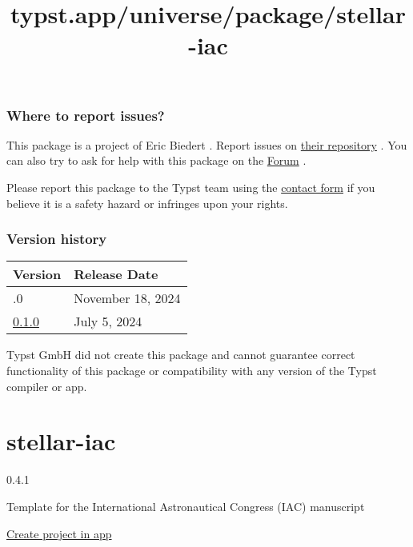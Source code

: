 \subsubsection{Where to report issues?}\label{where-to-report-issues}

This package is a project of Eric Biedert . Report issues on
\href{https://github.com/EpicEricEE/typst-quick-maths}{their repository}
. You can also try to ask for help with this package on the
\href{https://forum.typst.app}{Forum} .

Please report this package to the Typst team using the
\href{https://typst.app/contact}{contact form} if you believe it is a
safety hazard or infringes upon your rights.

\label{versions}
\subsubsection{Version history}\label{version-history}

\begin{longtable}[]{@{}ll@{}}
\toprule\noalign{}
Version & Release Date \\
\midrule\noalign{}
\endhead
\bottomrule\noalign{}
\endlastfoot
0.2.0 & November 18, 2024 \\
\href{https://typst.app/universe/package/quick-maths/0.1.0/}{0.1.0} &
July 5, 2024 \\
\end{longtable}

Typst GmbH did not create this package and cannot guarantee correct
functionality of this package or compatibility with any version of the
Typst compiler or app.


\title{typst.app/universe/package/stellar-iac}

\label{banner}
\label{template-thumbnail}

\section{stellar-iac}\label{stellar-iac}

{ 0.4.1 }

Template for the International Astronautical Congress (IAC) manuscript

\href{/app?template=stellar-iac&version=0.4.1}{Create project in app}

